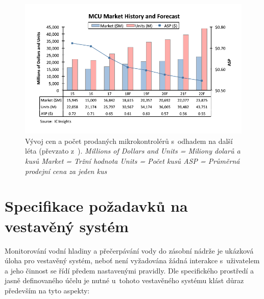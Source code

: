         \begin{figure}[h]
            \centering
            \includegraphics[width=\linewidth]{obrazky-figures/mcu_market_history.pdf}
            \caption{Vývoj cen a počet prodaných mikrokontrolérů s~odhadem na další léta (převzato z~\cite{mcu_market_history}).\it\newline
                \newline Millions of Dollars and Units = Miliony dolarů a kusů
                \newline Market = Tržní hodnota
                \newline Units = Počet kusů
                \newline ASP = Průměrná prodejní cena za jeden kus}
            \label{img:trend_mcu}
        \end{figure}

    \section{Specifikace požadavků na vestavěný systém}
        Monitorování vodní hladiny a přečerpávání vody do zásobní nádrže je ukázková úloha pro vestavěný systém, neboť není vyžadována žádná interakce s~uživatelem a jeho činnost se řídí předem nastavenými pravidly. Dle specifického prostředí a jasně definovaného účelu je nutné u~tohoto vestavěného systému klást důraz především na tyto aspekty:

